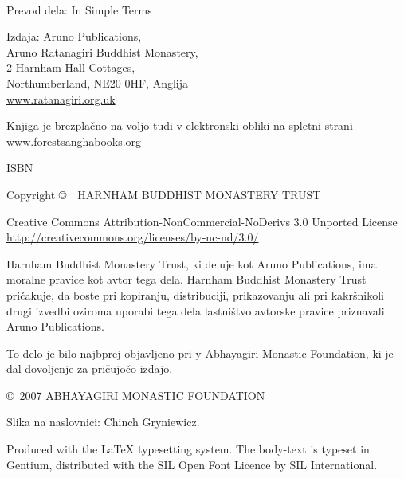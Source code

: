 \enlargethispage{2\baselineskip}
{\small\setlength{\parskip}{0.7em}\setlength{\parindent}{0em}%
{\raggedright%

\thetitle\\
\theauthor

Prevod dela: In Simple Terms

Izdaja: Aruno Publications,\\
Aruno Ratanagiri Buddhist Monastery,\\
2 Harnham Hall Cottages,\\
Northumberland, NE20 0HF, Anglija\\
\href{http://ratanagiri.org.uk}{www.ratanagiri.org.uk}

Knjiga je brezplačno na voljo tudi v elektronski obliki na spletni strani\\
\href{http://forestsanghabooks.org/}{www.forestsanghabooks.org}

ISBN \theISBN

Copyright \copyright\ \the\year\ HARNHAM BUDDHIST MONASTERY TRUST

\vfill

{\footnotesize

Creative Commons Attribution-NonCommercial-NoDerivs 3.0 Unported License\\
\href{http://creativecommons.org/licenses/by-nc-nd/3.0/}{http://creativecommons.org/licenses/by-nc-nd/3.0/}

Harnham Buddhist Monastery Trust, ki deluje kot Aruno Publications, ima moralne pravice kot avtor tega dela. Harnham Buddhist Monastery Trust pričakuje, da boste pri kopiranju, distribuciji, prikazovanju ali pri kakršnikoli drugi izvedbi oziroma uporabi tega dela lastništvo avtorske pravice priznavali Aruno Publications.

To delo je bilo najbprej objavljeno pri y Abhayagiri Monastic Foundation, ki je dal dovoljenje za pričujočo izdajo.

\copyright\ 2007 ABHAYAGIRI MONASTIC FOUNDATION

Slika na naslovnici: Chinch Gryniewicz.

Produced with the {\selectfont\LaTeX} typesetting system. The body-text is typeset in Gentium, distributed with the SIL Open Font Licence by SIL International.

\theEditionInfo

\thePrintedByInfo

}

}}

